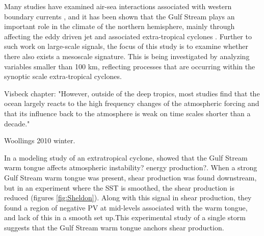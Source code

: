 Many studies have examined air-sea interactions associated with western boundary currents  \citep{ma2015distant, shaman2010air, kwon2010role, czaja2001observations, czaja2002observed, minobe2008influence, smirnov2015investigating, kelly2010western, cayan1992latent}, and it has been shown that the Gulf Stream plays an important role in the climate of the northern hemisphere, mainly through affecting the eddy driven jet and associated extra-tropical cyclones \citep{sampe2010significance, nakamura2008importance, booth2012sensitivity, small2014storm, woollings2012response, vanniere2017contribution, vanniere2017cold}. Further to such work on large-scale signals, the focus of this study is to examine whether there also exists a mesoscale signature. This is being investigated by analyzing variables smaller than 100 km, reflecting processes that are occurring within the synoptic scale extra-tropical cyclones.

Visbeck chapter: "However, outside of the deep tropics, most studies find that the ocean largely reacts to the high frequency changes of the atmospheric forcing and that its influence back to the atmosphere is weak on time scales shorter than a decade."


Woollings 2010 winter.

In a modeling study of an extratropical cyclone, \citet{sheldon2017warm} showed that the Gulf Stream warm tongue affects atmospheric instability? energy production?.  When a strong Gulf Stream warm tongue was present, shear production was found downstream, but in an experiment where the SST is smoothed, the shear production is reduced (figures \ref{fig:Sheldon}). Along with this signal in shear production, they found a region of negative PV at mid-levels associated with the warm tongue, and lack of this in a smooth set up.This experimental study of a single storm suggests that the Gulf Stream warm tongue anchors shear production.

